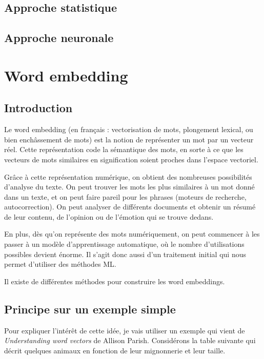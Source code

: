 \documentclass[11pt, a4paper]{report}
\begin{document}
  \section{Approche statistique}
  \section{Approche neuronale}

\chapter{Word embedding}
  \section{Introduction}
  Le word embedding (en français : vectorisation de mots, plongement lexical, ou bien enchâssement de mots)
est la notion de représenter un mot par un vecteur réel. Cette représentation code la sémantique
des mots, en sorte à ce que les vecteurs de mots similaires en signification soient proches 
dans l'espace vectoriel. 

Grâce à cette représentation numérique, on obtient des nombreuses 
possibilités d'analyse du texte. On peut trouver les mots les plus similaires à un mot donné 
dans un texte, et on peut faire pareil pour les phrases (moteurs de recherche, autocorrection). 
On peut analyser de différents documents et obtenir un résumé de leur contenu, de l'opinion 
ou de l'émotion qui se trouve dedans. 

En plus, dès qu'on représente des mots numériquement, on peut commencer à les passer à un 
modèle d'apprentissage automatique, où le nombre d'utilisations possibles devient 
énorme. Il s'agit donc aussi d'un traitement initial qui nous permet 
d'utiliser des méthodes ML.

Il existe de différentes méthodes pour construire les word embeddings. 







  \section{Principe sur un exemple simple}

Pour expliquer l'intérêt de cette idée, je vais utiliser un exemple qui vient de 
\textit{Understanding word vectors} de Allison Parish. Considérons la table suivante qui décrit quelques 
animaux en fonction de leur mignonnerie et leur taille. 
\end{document}
